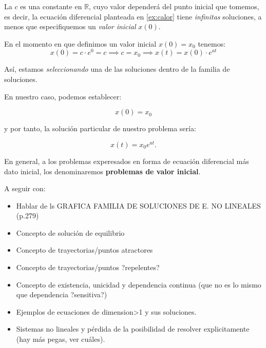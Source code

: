 La $c$ es una constante en $\mathbb{R}$, cuyo valor dependerá del punto inicial que tomemos, es decir, la ecuación diferencial planteada en \ref{ex:calor} tiene \emph{infinitas} soluciones, a menos que especifiquemos un \emph{valor inicial} $x(0)$.

En el momento en que definimos un valor inicial $x(0)=x_0$ tenemos:
\[x(0)=c\cdot e^0=c \implies c=x_0 \implies x(t) = x(0)\cdot e^{at}\]

Así, estamos \emph{seleccionando} una de las soluciones dentro de la familia de soluciones.


\begin{center}
\end{center}

En nuestro caso, podemos establecer:

\begin{equation}
x(0) = x_0
\end{equation}

y por tanto, la solución particular de nuestro problema sería:

\begin{equation}
x(t) = x_0e^{at}.
\end{equation}

En general, a los problemas experesados en forma de ecuación diferencial más dato inicial, los denominaremos \textbf{problemas de valor inicial}.

A seguir con:

\begin{itemize}
\item Hablar de ls GRAFICA FAMILIA DE SOLUCIONES DE E. NO LINEALES (p.279)
\item Concepto de solución de equilibrio
\item Concepto de trayectorias/puntos atractores
\item Concepto de trayectorias/puntos ?repelentes?
\item Concepto de existencia, unicidad y dependencia continua (que no es lo mismo que dependencia ?sensitiva?)
\item Ejemplos de ecuaciones de dimension>1 y sus soluciones.
\item Sistemas no lineales y pérdida de la posibilidad de resolver explicitamente (hay más pegas, ver cuáles).
\end{itemize}

